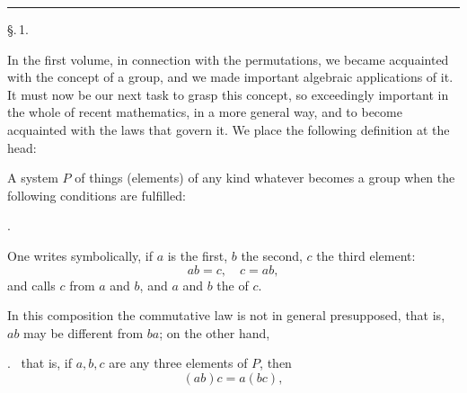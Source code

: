
\begin{center}

\vspace{1em}

\rule{2cm}{0.4pt}

\vspace{1em}
\S.\,1.

\end{center}

\noindent In the first volume, in connection with the permutations, we became acquainted with the concept of a group, and we made important algebraic applications of it. It must now be our next task to grasp this concept, so exceedingly important in the whole of recent mathematics, in a more general way, and to become acquainted with the laws that govern it. We place the following definition at the head:

A system $P$ of things (elements) of any kind whatever becomes a group when the following conditions are fulfilled:

.\ 

One writes symbolically, if $a$ is the first, $b$ the second, $c$ the third element:
\[
ab = c, \quad c = ab,
\]
and calls $c$  from $a$ and $b$, and $a$ and $b$ the  of $c$.

In this composition the commutative law is not in general presupposed, that is, $ab$ may be different from $ba$; on the other hand,

.\  that is, if $a, b, c$ are any three elements of $P$, then
\[
(ab)c = a(bc),
\]
